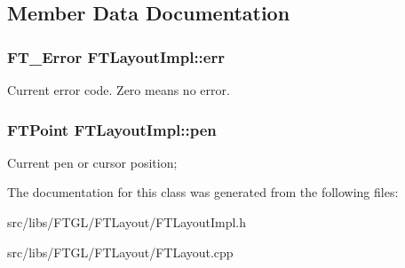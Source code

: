 \subsection{Member Data Documentation}
\hypertarget{class_f_t_layout_impl_af3c9ad6d6636a69a6643d68383e4edcd}{
\subsubsection[{err}]{\setlength{\rightskip}{0pt plus 5cm}FT\_\-Error {\bf FTLayoutImpl::err}}}
\label{class_f_t_layout_impl_af3c9ad6d6636a69a6643d68383e4edcd}
Current error code. Zero means no error. \hypertarget{class_f_t_layout_impl_aefaff875c0cf4fe5710897f614be44ac}{
\subsubsection[{pen}]{\setlength{\rightskip}{0pt plus 5cm}FTPoint {\bf FTLayoutImpl::pen}}}
\label{class_f_t_layout_impl_aefaff875c0cf4fe5710897f614be44ac}
Current pen or cursor position; 

The documentation for this class was generated from the following files:\begin{DoxyCompactItemize}
\item 
src/libs/FTGL/FTLayout/FTLayoutImpl.h\item 
src/libs/FTGL/FTLayout/FTLayout.cpp\end{DoxyCompactItemize}
